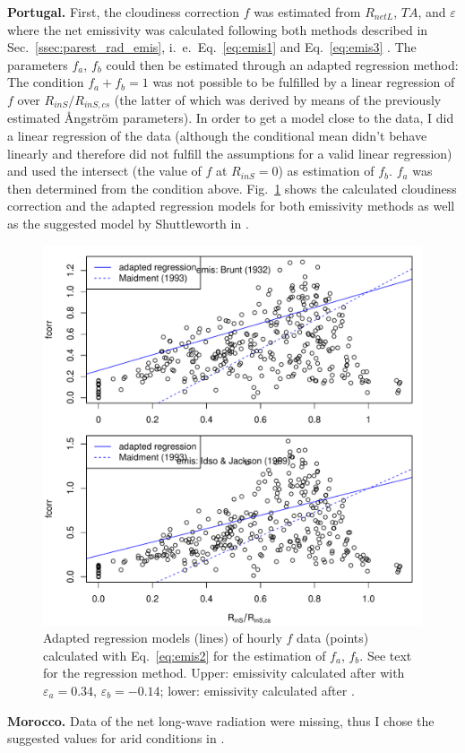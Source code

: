 \documentclass{scrreprt}
\begin{document}
\noindent
\textbf{Portugal.}
First, the cloudiness correction $f$ was estimated from $R_{netL}$, $TA$, and $\varepsilon$ where the net emissivity was calculated following both methods described in Sec.~\ref{ssec:parest_rad_emis}, i.~e.\ Eq.~\eqref{eq:emis1} \citep{brunt32} and Eq.~\eqref{eq:emis3} \citep{idso69}.
The parameters $f_a$, $f_b$ could then be estimated through an adapted regression method:
The condition $f_a + f_b = 1$ was not possible to be fulfilled by a linear regression of $f$ over $R_{inS}/R_{inS,cs}$ (the latter of which was derived by means of the previously estimated {\AA}ngstr\"om parameters).
In order to get a model close to the data, I did a linear regression of the data (although the conditional mean didn't behave linearly and therefore did not fulfill the assumptions for a valid linear regression) and used the intersect (the value of $f$ at $R_{inS} = 0$) as estimation of $f_b$.
$f_a$ was then determined from the condition above.
Fig.~\ref{fig:portugal_fcorr} shows the calculated cloudiness correction and the adapted regression models for both emissivity methods as well as the suggested model by Shuttleworth in \citet{maidment93}.

\begin{figure}[ht]
  \centering
  \includegraphics[width=0.6\hsize]{./plot_fcorr_both.pdf}
  \caption{Adapted regression models (lines) of hourly $f$ data (points) calculated with Eq.~\eqref{eq:emis2} for the estimation of $f_a$, $f_b$.
           See text for the regression method.
           Upper: emissivity calculated after \citet{brunt32} with $\varepsilon_a = 0.34$, $\varepsilon_b = -0.14$; lower: emissivity calculated after \citet{idso69}.}
  \label{fig:portugal_fcorr}
\end{figure}

\noindent
\textbf{Morocco.}
Data of the net long-wave radiation were missing, thus I chose the suggested values for arid conditions in \citet{maidment93}.
\end{document}
